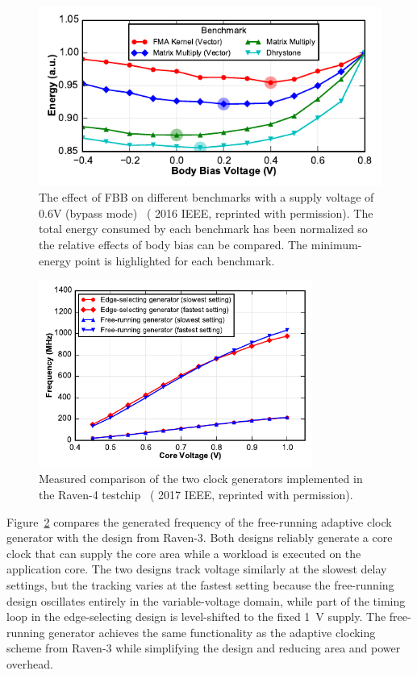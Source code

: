 \documentclass[graybox]{svmult}
\begin{document}
\begin{figure}
  \centering
  \includegraphics[width=\textwidth]{6-raven4-fbb}
  \caption{The effect of FBB on different benchmarks with a supply voltage of 0.6V (bypass mode)~\cite{Keller2016} ({\textcopyright} 2016 IEEE, reprinted with permission).  The total energy consumed by each benchmark has been normalized so the relative effects of body bias can be compared.  The minimum-energy point is highlighted for each benchmark.}
  \label{fig:6-raven4-fbb}
\end{figure}

\begin{figure}
  \centering
  \includegraphics[width=0.8\textwidth]{6-raven4-clockgen}
  \caption{Measured comparison of the two clock generators implemented in the Raven-4 testchip~\cite{Keller2017} ({\textcopyright} 2017 IEEE, reprinted with permission).}
  \label{fig:6-raven4-clockgen}
\end{figure}

Figure~\ref{fig:6-raven4-clockgen} compares the generated frequency of the free-running adaptive clock generator with the design from Raven-3.
Both designs reliably generate a core clock that can supply the core area while a workload is executed on the application core.
The two designs track voltage similarly at the slowest delay settings, but the tracking varies at the fastest setting because the free-running design oscillates entirely in the variable-voltage domain, while part of the timing loop in the edge-selecting design is level-shifted to the fixed \SI{1}{\volt} supply.
The free-running generator achieves the same functionality as the adaptive clocking scheme from Raven-3 while simplifying the design and reducing area and power overhead.
\end{document}
